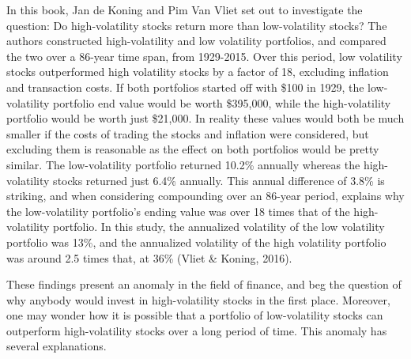 \documentclass[12pt,twoside]{reedthesis}
\theoremstyle{definition}
\theoremstyle{definition}
\theoremstyle{definition}
\theoremstyle{remark}
\begin{document}
In this book, Jan de Koning and Pim Van Vliet set out to investigate the
question: Do high-volatility stocks return more than low-volatility
stocks? The authors constructed high-volatility and low volatility
portfolios, and compared the two over a 86-year time span, from
1929-2015. Over this period, low volatility stocks outperformed high
volatility stocks by a factor of 18, excluding inflation and transaction
costs. If both portfolios started off with \$100 in 1929, the
low-volatility portfolio end value would be worth \$395,000, while the
high-volatility portfolio would be worth just \$21,000. In reality these
values would both be much smaller if the costs of trading the stocks and
inflation were considered, but excluding them is reasonable as the
effect on both portfolios would be pretty similar. The low-volatility
portfolio returned 10.2\% annually whereas the high-volatility stocks
returned just 6.4\% annually. This annual difference of 3.8\% is
striking, and when considering compounding over an 86-year period,
explains why the low-volatility portfolio's ending value was over 18
times that of the high-volatility portfolio. In this study, the
annualized volatility of the low volatility portfolio was 13\%, and the
annualized volatility of the high volatility portfolio was around 2.5
times that, at 36\% (Vliet \& Koning, 2016).

These findings present an anomaly in the field of finance, and beg the
question of why anybody would invest in high-volatility stocks in the
first place. Moreover, one may wonder how it is possible that a
portfolio of low-volatility stocks can outperform high-volatility stocks
over a long period of time. This anomaly has several explanations.
\end{document}
